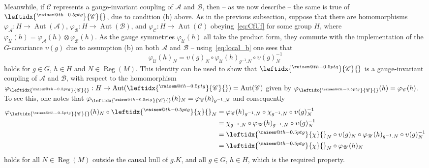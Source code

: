 \documentclass[sn-mathphys-num]{sn-jnl}%
\makeatletter
\newcommand{\raisemath}[1]{\mathpalette{\raisem@th{#1}}}
\newcommand{\raisem@th}[3]{\raisebox{#1}{$#2#3$}}
\newcommand{\act}[2]{\leftidx{^{\raisemath{-0.5pt}{#1}}}{#2}{}}
\newcommand{\Af}{\mathscr{A}}
\newcommand{\Bf}{\mathscr{B}}
\newcommand{\Cf}{\mathscr{C}}
\newcommand{\Uf}{\mathscr{U}}
\DeclareMathOperator{\Aut}{Aut}
\DeclareMathOperator{\Reg}{Reg}
\numberwithin{equation}{section}
\theoremstyle{thmstyleone}%
\theoremstyle{thmstyletwo}%
\theoremstyle{thmstylethree}%
\makeatother
\begin{document}
Meanwhile, if $\Cf$ represents a gauge-invariant coupling of $\Af$ and $\Bf$, then -- as we now describe -- the same is true of $\act{g}{\Cf}$, due to condition (b) above. As in the previous subsection, suppose that there are
homomorphisms $\varphi_\Af:H\to\Aut(\Af)$, $\varphi_\Bf:H\to\Aut(\Bf)$, and
$\varphi_\Cf:H\to\Aut(\Cf)$ obeying~\eqref{eq:CfUf} for some group $H$, where $\varphi_\Uf(h)=\varphi_\Af(h)\otimes \varphi_\Bf(h)$. As the gauge symmetries $\varphi_\Uf(h)$ all take the product form, they commute with the implementation of the $G$-covariance $\upsilon(g)$ due to assumption (b) on both $\Af$ and $\Bf$ -- using~\eqref{eq:local_b} one sees that
\begin{equation}
    \varphi_\Uf(h)_N=\upsilon(g)_{N}\circ \varphi_{\Uf}(h)_{g^{-1}.N}\circ \upsilon(g)^{-1}_N
\end{equation} 
holds for $g\in G$, $h\in H$ and $N\in\Reg(M)$. This identity can be used to show that $\act{g}{\Cf}$ is a gauge-invariant coupling of $\Af$ and $\Bf$, with respect to the homomorphism  $\varphi_{\act{g}{\Cf}}:H\to\Aut(\act{g}{\Cf})=\Aut(\Cf)$ given by 
$\varphi_{\act{g}{\Cf}}(h)  = \varphi_\Cf(h)$. To see this, one notes that
$\varphi_{\act{g}{\Cf}}(h)_N = \varphi_\Cf(h)_{g^{-1}.N}$ and consequently
\begin{align}
    \varphi_{\act{g}{\Cf}}(h)_N\circ\act{g}{\chi}_N 
    &=\varphi_{\Cf}(h)_{g^{-1}.N}\circ\chi_{g^{-1}.N} \circ \upsilon(g)^{-1}_N \nonumber \\
   &= 
    \chi_{g^{-1}.N} \circ\varphi_{\Uf}(h)_{g^{-1}.N}\circ \upsilon(g)^{-1}_N  
   \nonumber \\
   &= \act{g}{\chi}_N\circ \upsilon(g)_{N}\circ \varphi_{\Uf}(h)_{g^{-1}.N}\circ \upsilon(g)^{-1}_N  
    \nonumber \\
    &=\act{g}{\chi}_N\circ\varphi_\Uf(h)_N
\end{align}
holds for all $N\in\Reg(M)$ outside the causal hull of $g.K$, and all $g\in G$, $h\in H$, which is the required property. 
\end{document}
